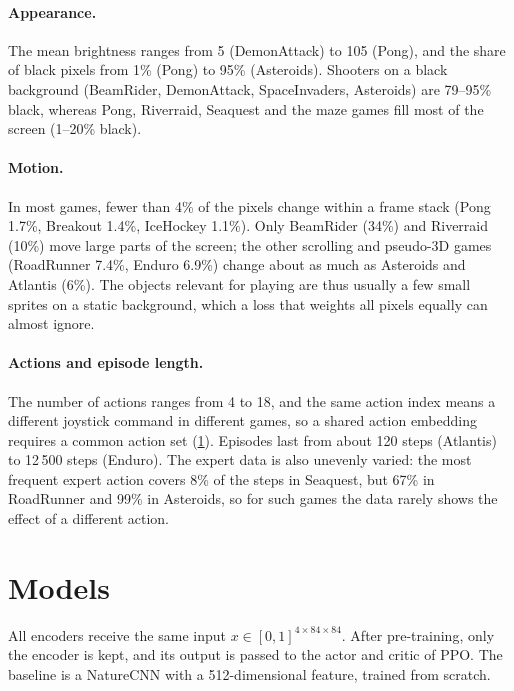 \documentclass[runningheads]{llncs}
\begin{document}
\paragraph{Appearance.} The mean brightness ranges from 5 (DemonAttack) to 105 (Pong), and
the share of black pixels from 1\% (Pong) to 95\% (Asteroids). Shooters on a black background
(BeamRider, DemonAttack, SpaceInvaders, Asteroids) are 79--95\% black, whereas Pong, Riverraid,
Seaquest and the maze games fill most of the screen (1--20\% black).

\paragraph{Motion.} In most games, fewer than 4\% of the pixels change within a frame stack
(Pong 1.7\%, Breakout 1.4\%, IceHockey 1.1\%). Only BeamRider (34\%) and Riverraid (10\%) move
large parts of the screen; the other scrolling and pseudo-3D games (RoadRunner 7.4\%, Enduro
6.9\%) change about as much as Asteroids and Atlantis (6\%). The objects relevant for playing are thus usually a few small sprites on a static background,
which a loss that weights all pixels equally can almost ignore.

\paragraph{Actions and episode length.} The number of actions ranges from 4 to 18, and the same
action index means a different joystick command in different games, so a shared action
embedding requires a common action set (\cref{sec:models}). Episodes last from about
120 steps (Atlantis) to 12\,500 steps (Enduro). The expert data is also unevenly varied: the most frequent expert action covers 8\% of the
steps in Seaquest, but 67\% in RoadRunner and 99\% in Asteroids, so for such games the data
rarely shows the effect of a different action.

\section{Models}
\label{sec:models}

All encoders receive the same input $x\in[0,1]^{4\times84\times84}$. After pre-training, only the encoder is kept, and its output is passed to the actor and critic
of PPO. The baseline is a NatureCNN with a 512-dimensional feature, trained
from scratch.
\end{document}
